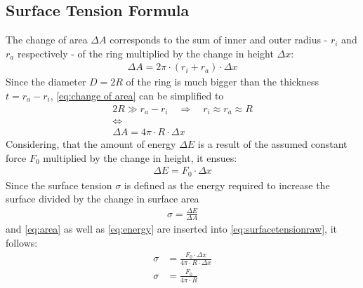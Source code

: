         \subsection*{Surface Tension Formula}\label{sec:A2 derive eq.4}%
            The change of area $ \Delta A $ corresponds to the sum of inner and outer radius - $ r_i $ and $ r_a $ respectively - of
            the ring multiplied by the change in height $ \Delta x $:
            \begin{align}
                \Delta A = 2\pi \cdot (r_i + r_a) \cdot \Delta x
                \label{eq:change of area}
            \end{align}
            Since the diameter $ D = 2R $ of the ring is much bigger than the thickness $ t = r_a - r_i $, \cref{eq:change of area}
            can be simplified to
            \begin{equation}
                \begin{gathered}
                    2R \gg r_a-r_i \quad \Rightarrow \quad r_i \approx r_a \approx R \\
                    \Leftrightarrow \\
                    \Delta A = 4\pi \cdot R \cdot \Delta x
                    \label{eq:area}
                \end{gathered}
            \end{equation}
            Considering, that the amount of energy $ \Delta E $ is a result of the assumed constant force $ F_0 $ multiplied
            by the change in height, it ensues:
            \begin{align}
                \Delta E = F_0 \cdot \Delta x
                \label{eq:energy}
            \end{align}
            Since the surface tension $ \sigma $ is defined as the energy required to increase the surface divided by the change in surface area
            \begin{align}
                \sigma = \frac{\Delta E}{\Delta A}
                \label{eq:surfacetensionraw}
            \end{align}
            and \cref{eq:area} as well as \cref{eq:energy} are inserted into \cref{eq:surfacetensionraw}, it follows:
            \begin{align}
                \sigma &= \frac{F_0 \cdot \Delta x}{4\pi \cdot R \cdot \Delta x} \nonumber\\
                \sigma &= \frac{F_0}{4\pi \cdot R}
                \label{eq:surfacetension}
            \end{align}
